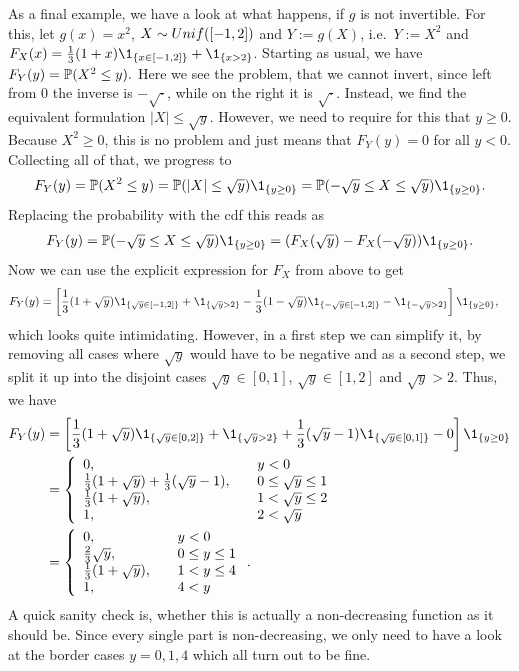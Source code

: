 As a final example, we have a look at what happens, if $g$ is not invertible. For this, let $g(x)= x^2$, $X \sim {\mathop{Unif}}([-1,2])$ and $Y:= g(X)$, i.e.\ $Y:= X^2$ and $F_X(x) = \frac13 (1+x) \1_{\{x \in [-1,2]\}} + \1_{\{x > 2\}}$. Starting as usual, we have
$F_Y(y)
= {\mathbb P} ( X^2 \leq y ).$ Here we see the problem, that we cannot invert, since left from $0$ the inverse is $-\sqrt{\cdot}$, while on the right it is $\sqrt{\cdot}$. Instead, we find the equivalent formulation $\vert X \vert \leq \sqrt{y}$. However, we need to require for this that $y \geq 0$. Because $X^2 \geq 0$, this is no problem and just means that $F_Y(y) =0$ for all $y<0$. Collecting all of that, we progress to
$$ F_Y(y) 
= \PP ( X^2 \leq y ) 
= \PP ( \vert X \vert \leq \sqrt{y}) \1_{\{y \geq 0\}}
= \PP ( -\sqrt{y} \leq X \leq \sqrt{y}) \1_{\{y \geq 0\}}
.
$$
Replacing the probability with the cdf this reads as
$$ F_Y(y)
= \PP ( -\sqrt{y} \leq X \leq \sqrt{y}) \1_{\{y \geq 0\}}
= (F_X(\sqrt{y})-F_X(-\sqrt{y}))\1_{\{y \geq 0\}}
.
$$
Now we can use the explicit expression for $F_X$ from above to get
\begin{align*}
F_Y(y)
&
=
\left[ \frac13 (1+\sqrt{y}) \1_{\{\sqrt{y} \in [-1,2]\}} + \1_{\{\sqrt{y} > 2\}} - \frac13 (1-\sqrt{y}) \1_{\{-\sqrt{y} \in [-1,2]\}} - \1_{\{-\sqrt{y} > 2\}} \right] \1_{\{y \geq 0\}}
,
\end{align*}
which looks quite intimidating. However, in a first step we can simplify it, by removing all cases where $\sqrt{y}$ would have to be negative and as a second step, we split it up into the disjoint cases $\sqrt{y} \in [0,1]$, $\sqrt{y} \in [1,2]$ and $\sqrt{y} > 2$. Thus, we have
\begin{align*}
F_Y(y)
&
=
\left[ \frac13 (1+\sqrt{y}) \1_{\{\sqrt{y} \in [0,2]\}} + \1_{\{\sqrt{y} > 2\}} + \frac13 (\sqrt{y}-1) \1_{\{\sqrt{y} \in [0,1]\}} - 0 \right] \1_{\{y \geq 0\}}
\\ &
=
\left\{ \begin{array}{ll}
0, \quad & y < 0 \\
\frac13 (1+\sqrt{y}) + \frac13 (\sqrt{y}-1), \quad & 0 \leq \sqrt{y} \leq 1\\
\frac13 (1+\sqrt{y}), \quad & 1 < \sqrt{y} \leq 2 \\
1, \quad & 2 < \sqrt{y}
\end{array}
\right.
\\ &
=
\left\{ \begin{array}{ll}
0, \quad & y < 0 \\
\frac23 \sqrt{y}, \quad & 0 \leq y \leq 1\\
\frac13 (1+\sqrt{y}), \quad & 1 < y \leq 4 \\
1, \quad & 4 < y
\end{array}
\right.
.
\end{align*}
A quick sanity check is, whether this is actually a non-decreasing function as it should be. Since every single part is non-decreasing, we only need to have a look at the border cases $y=0,1,4$ which all turn out to be fine.

